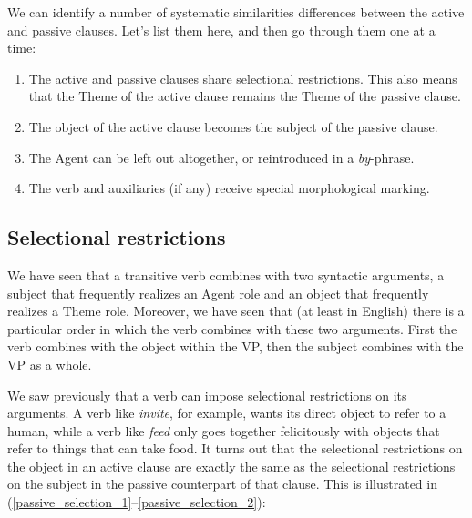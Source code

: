 \documentclass{article}
\begin{document}
We can identify a number of systematic similarities differences between the active and passive clauses. Let's list them here, and then go through them one at a time:
\begin{enumerate}
    \item The active and passive clauses share selectional restrictions. This also means that the Theme of the active clause remains the Theme of the passive clause.
    \item The object of the active clause becomes the subject of the passive clause.
    \item The Agent can be left out altogether, or reintroduced in a \emph{by}-phrase.
    \item The verb and auxiliaries (if any) receive special morphological marking.
\end{enumerate}

    \subsection{Selectional restrictions}
We have seen that a transitive verb combines with two syntactic arguments, a subject that frequently realizes an Agent role and an object that frequently realizes a Theme role.
Moreover, we have seen that (at least in English) there is a particular order in which the verb combines with these two arguments.
First the verb combines with the object within the VP, then the subject combines with the VP as a whole.

We saw previously that a verb can impose selectional restrictions on its arguments.
A verb like \emph{invite}, for example, wants its direct object to refer to a human, while a verb like \emph{feed} only goes together felicitously with objects that refer to things that can take food.
It turns out that the selectional restrictions on the object in an active clause are exactly the same as the selectional restrictions on the subject in the passive counterpart of that clause.
This is illustrated in (\ref{passive_selection_1}--\ref{passive_selection_2}):
\begin{exe}
    \label{passive_selection_1}
    \label{passive_selection_2}
\end{exe}
\end{document}
